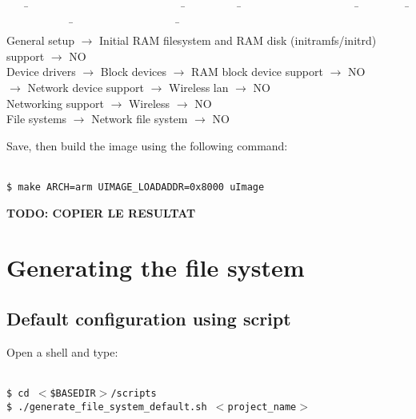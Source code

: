 \documentclass[openany,a4paper]{book}
\begin{document}
\begin{tabbing}
\kill \ \ \ \= \ \ \ \ \ \ \ \ \ \ \ \ \ \ \ \ \ \ \ \ \ \ \ \ \ \ \ \ \= \ \ \ \ \ \ \ \ \ \ \= \ \ \ \ \ \ \ \ \ \ \ \ \ \ \ \ \ \ \ \ \ \= \ \ \ \ \ \ \ \ \ \= \ \ \ \ \ \ \ \ \ \ \ \ \= \ \ \ \ \ \ \ \ \ \ \ \ \ \ \ \ \ \ \ \= \ \ \ \ \ \ \ \ \ \ \ \ \ \ \ \ \ \ \ \= \\
\> General setup      \> $\rightarrow$ Initial RAM filesystem and RAM disk (initramfs/initrd) support \>\>\>\>\>\> $\rightarrow$ NO \\
\> Device drivers     \> $\rightarrow$ Block devices          \>\>\> $\rightarrow$ RAM block device support \>\>\> $\rightarrow$ NO \\
\>                    \> $\rightarrow$ Network device support \>\>\> $\rightarrow$ Wireless lan             \>\>\> $\rightarrow$ NO \\
\> Networking support \> $\rightarrow$ Wireless               \>\> $\rightarrow$ NO \\
\> File systems       \> $\rightarrow$ Network file system    \>\> $\rightarrow$ NO \\
\end{tabbing}

Save, then build the image using the following command:

\begin{tabbing}
\kill \hspace{1cm} \= \\
\> \texttt{\$ make ARCH=arm UIMAGE\_LOADADDR=0x8000 uImage }\\
\end{tabbing}

\textbf{ TODO: COPIER LE RESULTAT}

\section{Generating the file system}

\subsection{Default configuration using script}

Open a shell and type:

\begin{tabbing}
\kill \hspace{1cm} \= \\
\> \texttt{\$ cd $<$\$BASEDIR$>$/scripts} \\
\> \texttt{\$ ./generate\_file\_system\_default.sh $<$project\_name$>$}
\end{tabbing}
\end{document}
